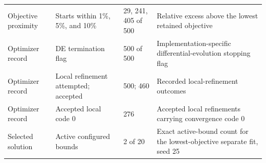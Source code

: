\begin{longtable}{@{}p{}p{}p{}p{}@{}}
\midrule
Objective proximity & Starts within 1\%, 5\%, and 10\% & 29, 241, 405 of 500 & Relative excess above the lowest retained objective \\
Optimizer record & DE termination flag & 500 of 500 & Implementation-specific differential-evolution stopping flag \\
Optimizer record & Local refinement attempted; accepted & 500; 460 & Recorded local-refinement outcomes \\
Optimizer record & Accepted local code 0 & 276 & Accepted local refinements carrying convergence code 0 \\
Selected solution & Active configured bounds & 2 of 20 & Exact active-bound count for the lowest-objective separate fit, seed 25 \\
\bottomrule
\end{longtable}
\endgroup
